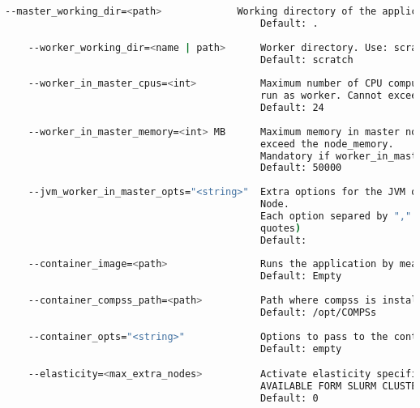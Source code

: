 \begin{lstlisting}[language=bash]
    --master_working_dir=<path>             Working directory of the application
                                            Default: .
                                            
    --worker_working_dir=<name | path>      Worker directory. Use: scratch | gpfs | <path>
                                            Default: scratch
                                              
    --worker_in_master_cpus=<int>           Maximum number of CPU computing units that the master node can
                                            run as worker. Cannot exceed cpus_per_node.
                                            Default: 24
                                            
    --worker_in_master_memory=<int> MB      Maximum memory in master node assigned to the worker. Cannot
                                            exceed the node_memory.
                                            Mandatory if worker_in_master_cpus is specified.
                                            Default: 50000
                                            
    --jvm_worker_in_master_opts="<string>"  Extra options for the JVM of the COMPSs Worker in the Master
                                            Node. 
                                            Each option separed by "," and without blank spaces (Notice the
                                            quotes)
                                            Default: 
                                            
    --container_image=<path>                Runs the application by means of a container engine image
                                            Default: Empty
                                            
    --container_compss_path=<path>          Path where compss is installed in the container image
                                            Default: /opt/COMPSs
                                            
    --container_opts="<string>"             Options to pass to the container engine
                                            Default: empty

    --elasticity=<max_extra_nodes>          Activate elasticity specifiying the maximum extra nodes (ONLY
                                            AVAILABLE FORM SLURM CLUSTERS WITH NIO ADAPTOR)
                                            Default: 0


\end{lstlisting}
